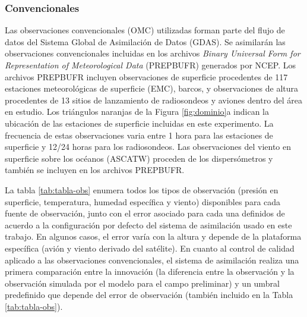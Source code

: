 \documentclass[12pt,oneside,a4paper]{reedthesis}
\begin{document}
\hypertarget{convencionales}{%
\subsubsection{Convencionales}\label{convencionales}}

Las observaciones convencionales (OMC) utilizadas forman parte del flujo de datos del Sistema Global de Asimilación de Datos (GDAS). Se asimilarán las observaciones convencionales incluidas en los archivos \emph{Binary Universal Form for Representation of Meteorological Data} (PREPBUFR) generados por NCEP. Los archivos PREPBUFR incluyen observaciones de superficie procedentes de 117 estaciones meteorológicas de superficie (EMC), barcos, y observaciones de altura procedentes de 13 sitios de lanzamiento de radiosondeos y aviones dentro del área en estudio. Los triángulos naranjas de la Figura \ref{fig:dominio}a indican la ubicación de las estaciones de superficie incluidas en este experimento. La frecuencia de estas observaciones varia entre 1 hora para las estaciones de superficie y 12/24 horas para los radiosondeos. Las observaciones del viento en superficie sobre los océanos (ASCATW) proceden de los dispersómetros y también se incluyen en los archivos PREPBUFR.

La tabla \ref{tab:tabla-obs} enumera todos los tipos de observación (presión en superficie, temperatura, humedad específica y viento) disponibles para cada fuente de observación, junto con el error asociado para cada una definidos de acuerdo a la configuración por defecto del sistema de asimilación usado en este trabajo. En algunos casos, el error varía con la altura y depende de la plataforma específica (avión y viento derivado del satélite). En cuanto al control de calidad aplicado a las observaciones convencionales, el sistema de asimilación realiza una primera comparación entre la innovación (la diferencia entre la observación y la observación simulada por el modelo para el campo preliminar) y un umbral predefinido que depende del error de observación (también incluido en la Tabla \ref{tab:tabla-obs}).
\end{document}
